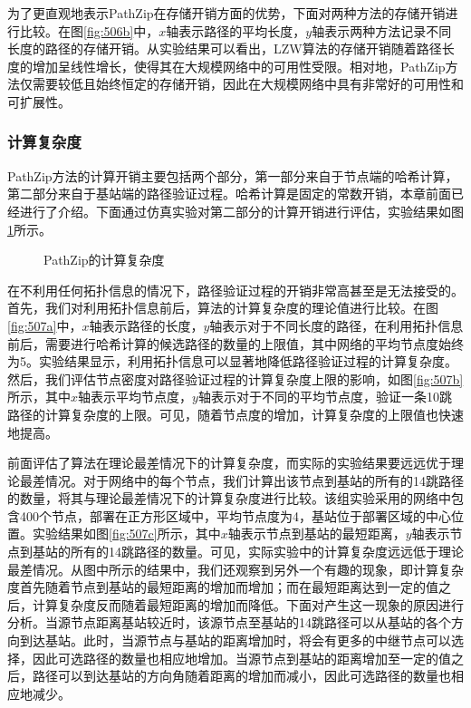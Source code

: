 为了更直观地表示PathZip在存储开销方面的优势，下面对两种方法的存储开销进行比较。在图\ref{fig:506b}中，$x$轴表示路径的平均长度，$y$轴表示两种方法记录不同长度的路径的存储开销。从实验结果可以看出，LZW算法的存储开销随着路径长度的增加呈线性增长，使得其在大规模网络中的可用性受限。相对地，PathZip方法仅需要较低且始终恒定的存储开销，因此在大规模网络中具有非常好的可用性和可扩展性。
\subsubsection{计算复杂度}
PathZip方法的计算开销主要包括两个部分，第一部分来自于节点端的哈希计算，第二部分来自于基站端的路径验证过程。哈希计算是固定的常数开销，本章前面已经进行了介绍。下面通过仿真实验对第二部分的计算开销进行评估，实验结果如图\ref{fig:507}所示。
\begin{figure}[t]
  \centering
  \hspace{0.5em}%
  \hspace{0.5em}%
  \hspace{0.5em}%
  \caption{PathZip的计算复杂度}
  \label{fig:507}
\end{figure}

在不利用任何拓扑信息的情况下，路径验证过程的开销非常高甚至是无法接受的。首先，我们对利用拓扑信息前后，算法的计算复杂度的理论值进行比较。在图\ref{fig:507a}中，$x$轴表示路径的长度，$y$轴表示对于不同长度的路径，在利用拓扑信息前后，需要进行哈希计算的候选路径的数量的上限值，其中网络的平均节点度始终为5。实验结果显示，利用拓扑信息可以显著地降低路径验证过程的计算复杂度。然后，我们评估节点密度对路径验证过程的计算复杂度上限的影响，如图\ref{fig:507b}所示，其中$x$轴表示平均节点度，$y$轴表示对于不同的平均节点度，验证一条10跳路径的计算复杂度的上限。可见，随着节点度的增加，计算复杂度的上限值也快速地提高。

前面评估了算法在理论最差情况下的计算复杂度，而实际的实验结果要远远优于理论最差情况。对于网络中的每个节点，我们计算出该节点到基站的所有的14跳路径的数量，将其与理论最差情况下的计算复杂度进行比较。该组实验采用的网络中包含400个节点，部署在正方形区域中，平均节点度为4，基站位于部署区域的中心位置。实验结果如图\ref{fig:507c}所示，其中$x$轴表示节点到基站的最短距离，$y$轴表示节点到基站的所有的14跳路径的数量。可见，实际实验中的计算复杂度远远低于理论最差情况。从图中所示的结果中，我们还观察到另外一个有趣的现象，即计算复杂度首先随着节点到基站的最短距离的增加而增加；而在最短距离达到一定的值之后，计算复杂度反而随着最短距离的增加而降低。下面对产生这一现象的原因进行分析。当源节点距离基站较近时，该源节点至基站的14跳路径可以从基站的各个方向到达基站。此时，当源节点与基站的距离增加时，将会有更多的中继节点可以选择，因此可选路径的数量也相应地增加。当源节点到基站的距离增加至一定的值之后，路径可以到达基站的方向角随着距离的增加而减小，因此可选路径的数量也相应地减少。

